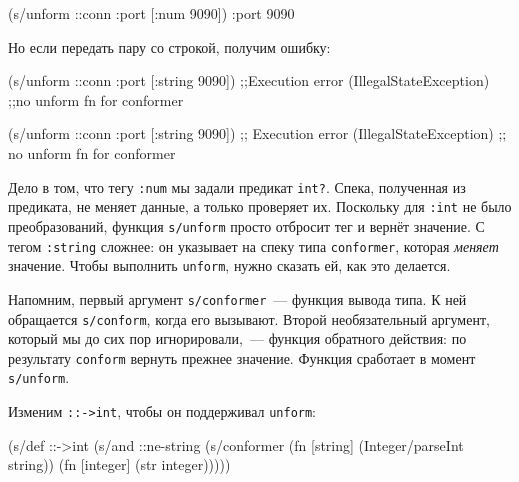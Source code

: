 \begin{english}
  \begin{clojure}
(s/unform ::conn {:port [:num 9090]})
{:port 9090}
  \end{clojure}
\end{english}

\noindent
Но если передать пару со строкой, получим ошибку:

\ifx\DEVICETYPE\MOBILE

\begin{english}
  \begin{clojure}
(s/unform ::conn {:port [:string 9090]})
;;Execution error (IllegalStateException)
;;no unform fn for conformer
  \end{clojure}
\end{english}

\else

\begin{english}
  \begin{clojure}
(s/unform ::conn {:port [:string 9090]})
;; Execution error (IllegalStateException)
;; no unform fn for conformer
  \end{clojure}
\end{english}

\fi

Дело в том, что тегу \verb|:num| мы задали предикат \verb|int?|. Спека,
полученная из предиката, не меняет данные, а только проверяет их. Поскольку для
\verb|:int| не было преобразований, функция \verb|s/unform| просто отбросит тег
и вернёт значение. С тегом \verb|:string| сложнее: он указывает на спеку типа
\verb|conformer|, которая \emph{меняет} значение. Чтобы выполнить \verb|unform|,
нужно сказать ей, как это делается.


Напомним, первый аргумент \verb|s/conformer|~--- функция вывода типа. К ней
обращается \verb|s/conform|, когда его вызывают. Второй необязательный аргумент,
который мы до сих пор игнорировали,~--- функция обратного действия: по
результату \verb|conform| вернуть прежнее значение. Функция сработает в момент
\verb|s/unform|.

Изменим \verb|::->int|, чтобы он поддерживал \verb|unform|:

\begin{english}
  \begin{clojure}
(s/def ::->int
  (s/and
   ::ne-string
   (s/conformer
    (fn [string]
      (Integer/parseInt string))
    (fn [integer]
      (str integer)))))
  \end{clojure}
\end{english}

